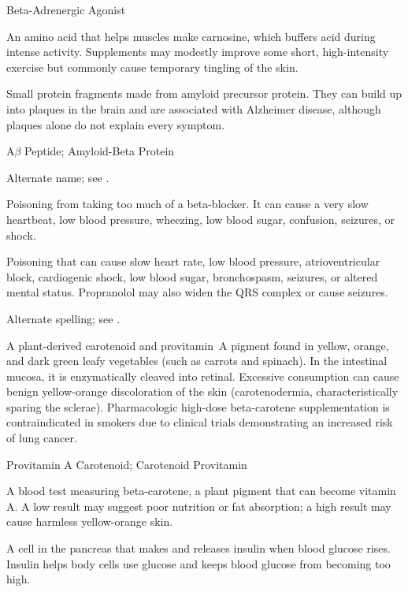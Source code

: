\synonyms
Beta-Adrenergic Agonist

 An amino acid that helps muscles make carnosine, which buffers acid during intense activity. Supplements may modestly improve some short, high-intensity exercise but commonly cause temporary tingling of the skin.

 Small protein fragments made from amyloid precursor protein. They can build up into plaques in the brain and are associated with Alzheimer disease, although plaques alone do not explain every symptom.

\synonyms
A$\beta$ Peptide; Amyloid-Beta Protein

 Alternate name; see .

 Poisoning from taking too much of a beta-blocker. It can cause a very slow heartbeat, low blood pressure, wheezing, low blood sugar, confusion, seizures, or shock.

 Poisoning that can cause slow heart rate, low
blood pressure, atrioventricular block, cardiogenic shock, low blood sugar,
bronchospasm, seizures, or altered mental status. Propranolol may also widen
the QRS complex or cause seizures.

 Alternate spelling; see .

 A plant-derived carotenoid and provitamin~A pigment found in yellow, orange, and dark green leafy vegetables (such as carrots and spinach). In the intestinal mucosa, it is enzymatically cleaved into retinal. Excessive consumption can cause benign yellow-orange discoloration of the skin (carotenodermia, characteristically sparing the sclerae). Pharmacologic high-dose beta-carotene supplementation is contraindicated in smokers due to clinical trials demonstrating an increased risk of lung cancer.

\synonyms
Provitamin A Carotenoid; Carotenoid Provitamin

 A blood test measuring beta-carotene, a plant pigment that can become vitamin A. A low result may suggest poor nutrition or fat absorption; a high result may cause harmless yellow-orange skin.

 A cell in the pancreas that makes and releases insulin when blood glucose rises. Insulin helps body cells use glucose and keeps blood glucose from becoming too high.

